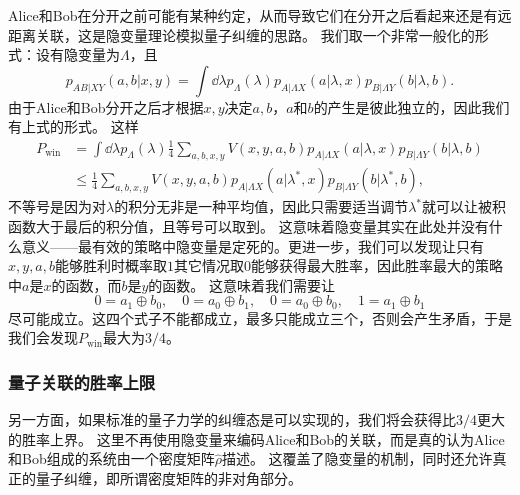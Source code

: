 \documentclass[hyperref, UTF8, a4paper]{ctexart}
\begin{document}
Alice和Bob在分开之前可能有某种约定，从而导致它们在分开之后看起来还是有远距离关联，这是隐变量理论模拟量子纠缠的思路。
我们取一个非常一般化的形式：设有隐变量为$\Lambda$，且
\[
    p_{AB|XY}(a, b | x, y) = \int \dd{\lambda} p_\Lambda(\lambda) p_{A|\Lambda X} (a | \lambda, x) p_{B|\Lambda Y}(b | \lambda, b).
\]
由于Alice和Bob分开之后才根据$x, y$决定$a, b$，$a$和$b$的产生是彼此独立的，因此我们有上式的形式。
这样
\[
    \begin{aligned}
        P_\text{win} &= \int \dd{\lambda} p_\Lambda(\lambda) \frac{1}{4} \sum_{a, b, x, y} V(x, y, a, b) p_{A|\Lambda X} (a | \lambda, x) p_{B|\Lambda Y}(b | \lambda, b) \\
        &\leq \frac{1}{4} \sum_{a, b, x, y} V(x, y, a, b) p_{A|\Lambda X} (a | \lambda^*, x) p_{B|\Lambda Y}(b | \lambda^*, b),
    \end{aligned}
\]
不等号是因为对$\lambda$的积分无非是一种平均值，因此只需要适当调节$\lambda^*$就可以让被积函数大于最后的积分值，且等号可以取到。
这意味着隐变量其实在此处并没有什么意义——最有效的策略中隐变量是定死的。更进一步，我们可以发现让只有$x, y, a, b$能够胜利时概率取$1$其它情况取$0$能够获得最大胜率，因此胜率最大的策略中$a$是$x$的函数，而$b$是$y$的函数。
这意味着我们需要让
\[
    0 = a_1 \oplus b_0, \quad 0 = a_0 \oplus b_1, \quad 0 = a_0 \oplus b_0, \quad 1 = a_1 \oplus b_1
\]
尽可能成立。这四个式子不能都成立，最多只能成立三个，否则会产生矛盾，于是我们会发现$P_\text{win}$最大为$3/4$。

\subsubsection{量子关联的胜率上限}

另一方面，如果标准的量子力学的纠缠态是可以实现的，我们将会获得比$3/4$更大的胜率上界。
这里不再使用隐变量来编码Alice和Bob的关联，而是真的认为Alice和Bob组成的系统由一个密度矩阵$\hat{\rho}$描述。
这覆盖了隐变量的机制，同时还允许真正的量子纠缠，即所谓密度矩阵的非对角部分。
\end{document}
